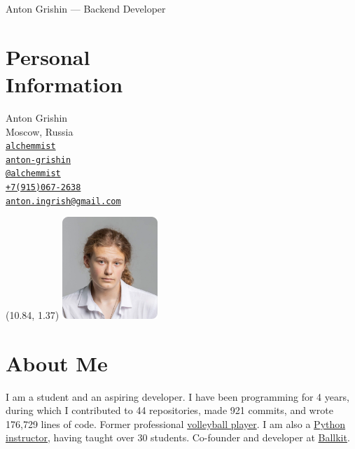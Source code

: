 \documentclass[margin,line]{resume}
\begin{document}
{\vspace*{-13mm}\sc \large Anton Grishin --- Backend Developer} \\
\begin{resume}
  \begin{minipage}[t]{0.55\textwidth}
    \section{\mysidestyle Personal\\Information}
    Anton Grishin \\
    Moscow, Russia \\
    \faGithub  \space
    \href{https://github.com/alchemmist/}{\texttt{alchemmist}} \\
    \faLinkedin \space
    \href{https://www.linkedin.com/in/anton-grishin-6966a8362/}{\texttt{anton-grishin}}
    \\
    \faPaperPlane \space \href{https://t.me/alchemmist}{\texttt{@alchemmist}} \\
    \faPhone \space
    \href{tel:+1234567890}{\color{blue}\texttt{+7(915)067-2638}}  \\
    \faEnvelope \space
    \href{mailto:anton.ingrish@gmail.com}{\color{blue}\texttt{anton.ingrish@gmail.com}}
  \end{minipage}

  \begin{minipage}[H]{0.18\textwidth}
    \begin{textblock}{7}(10.84, 1.37)
      \includegraphics[width=0.27\textwidth]{images/avatar.png}
    \end{textblock}
  \end{minipage}

  \vspace{-7mm}
  \section{\mysidestyle About Me}
  I am a student and an aspiring developer. I have been programming
  for 4 years, during which I contributed to 44 repositories, made
  921 commits, and wrote 176,729 lines of code. Former professional
  \href{https://github.com/alchemmist/CV/blob/main/attachments/sport.pdf}{volleyball
  player}. I am also a
  \href{https://www.avito.ru/moskva/predlozheniya_uslug/prepodavatel_programmirovaniya_na_python_2556461612}{Python
  instructor}, having taught over 30 students. Co-founder and
  developer at \href{https://ballkit.ru/}{Ballkit}.


\end{resume}
\end{document}
